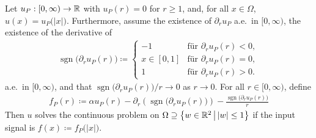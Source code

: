 \begin{frame}
  Let $u_P:[0,\infty)\to\mathbb{R}$ with $u_P(r)=0$ for $r\geq 1$,
  and, for all $x\in\Omega$, $u(x)= u_P\big(|x|\big)$. 
  Furthermore, assume the existence  of $\partial_r u_P$ a.e.\ in $[0,\infty)$,
  the existence of the derivative of
  \begin{align*}
    \operatorname{sgn}\big(\partial_r u_P(r)\big)
    \coloneqq
    \begin{cases}
      -1 &\text{für }\partial_r u_P(r)<0,\\
      x\in[0,1] &\text{für }\partial_r u_P(r)=0,\\ 
      1 &\text{für }\partial_r u_P(r)>0.
    \end{cases}
  \end{align*}
  a.e.\ in $[0,\infty)$, and
  that $\operatorname{sgn}\big(\partial_r u_P(r)\big)/r\to 0$ as $r\to 0$.
  For all $r\in[0,\infty)$, define 
  \begin{align*}
    f_P(r)
    \coloneqq 
    \alpha u_P(r) - \partial_r\left(\operatorname{sgn}\big(\partial_r u_P(r)\big)\right) 
    - \frac{\operatorname{sgn}\big(\partial_r u_P(r)\big)}{r}
  \end{align*}
  Then $u$ solves the continuous problem
  on $\Omega\supseteq \left\{w\in\mathbb{R}^2\,\middle|\, |w|\leq 1\right\}$ if
  the input signal is $f(x)\coloneqq f_P\big(|x|\big)$.
\end{frame}
